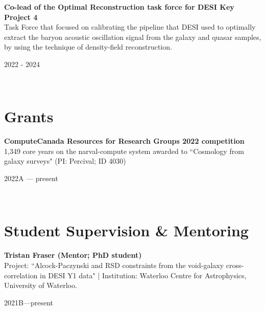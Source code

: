 \documentclass[12pt, a4paper]{article} %
\begin{document}
\begin{minipage}[t]{0.7\textwidth}
\begin{flushleft}%
  \setlength{\leftskip}{0.2cm}%
\textbf{Co-lead of the Optimal Reconstruction task force for DESI Key Project 4}\\
Task Force that focused on calibrating the pipeline that DESI used to optimally extract the baryon acoustic
oscillation signal from the galaxy and quasar samples, by using the technique of density-field reconstruction.\\
 \end{flushleft}
\end{minipage}
\begin{minipage}[t]{0.3\textwidth}
\hfill 2022 - 2024
\end{minipage}\\


\section*{Grants}

\begin{minipage}[t]{0.7\textwidth}
\begin{flushleft}%
  \setlength{\leftskip}{0.2cm}%
\textbf{ComputeCanada Resources for Research Groups 2022 competition}\\
1,349 core years on the narval-compute system awarded to  ``Cosmology from galaxy surveys" (PI: Percival; ID 4030)
\end{flushleft}
\end{minipage}
\begin{minipage}[t]{0.3\textwidth}
\hfill 2022A --- present
\end{minipage}\\



\section*{Student Supervision \& Mentoring}

\begin{minipage}[t]{0.7\textwidth}
\begin{flushleft}%
  \setlength{\leftskip}{0.2cm}%
\textbf{Tristan Fraser (Mentor; PhD student)}\\
Project: ``Alcock-Paczynski and RSD constraints from the void-galaxy cross-correlation in DESI Y1 data" | Institution: Waterloo Centre for Astrophysics, University of Waterloo.
\end{flushleft}
\end{minipage}
\begin{minipage}[t]{0.3\textwidth}
\hfill 2021B---present
\end{minipage}\\
\end{document}
